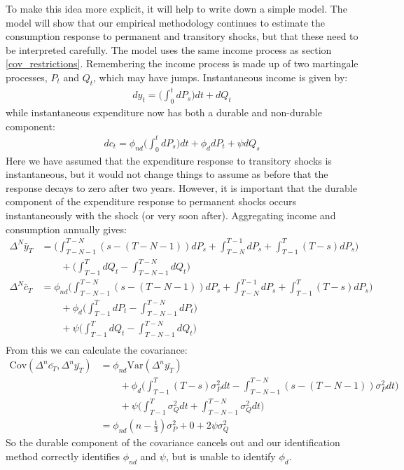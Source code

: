 \documentclass[titlepage]{\econtex}\newcommand{\texname}{ConsumptionHeterogeneity}
\begin{document}
To make this idea more explicit, it will help to write down a simple model. The model will show that our empirical methodology continues to estimate the consumption response to permanent and transitory shocks, but that these need to be interpreted carefully. The model uses the same income process as section \ref{cov_restrictions}. Remembering the income process is made up of two martingale processes, $P_t$ and $Q_t$, which may have jumps. Instantaneous income is given by:
\begin{align*}
dy_t = \Big( \int_{0}^{t}dP_s \Big) dt  +dQ_t 
\end{align*}
while instantaneous expenditure now has both a durable and non-durable component:
\begin{align*}
dc_t = \phi_{nd} \Big( \int_{0}^{t} dP_s  \Big) dt + \phi_{d} dP_t + \psi dQ_s
\end{align*}
Here we have assumed that the expenditure response to transitory shocks is instantaneous, but it would not change things to assume as before that the response decays to zero after two years. However, it is important that the durable component of the expenditure response to permanent shocks occurs instantaneously with the shock (or very soon after). Aggregating income and consumption annually gives:
\begin{align*}
\Delta^N \bar{y}_T &=  \Big(\int_{T-N-1}^{T-N} (s-(T-N-1))dP_s  + \int_{T-N}^{T-1}dP_s + \int_{T-1}^{T} (T-s)dP_s \Big) \\
& \qquad + \Big(\int_{T-1}^{T} dQ_t -\int_{T-N-1}^{T-N} dQ_t \Big) \\
\Delta^N \bar{c}_T &= \phi_{nd} \Big(\int_{T-N-1}^{T-N} (s-(T-N-1))dP_s  + \int_{T-N}^{T-1}dP_s + \int_{T-1}^{T} (T-s)dP_s \Big) \\
& \qquad + \phi_d \Big(\int_{T-1}^{T} dP_t -\int_{T-N-1}^{T-N} dP_t \Big) \\
& \qquad + \psi \Big(\int_{T-1}^{T} dQ_t -\int_{T-N-1}^{T-N} dQ_t \Big) \\
\end{align*}
From this we can calculate the covariance:
\begin{align*}
\mathrm{Cov}(\Delta^n \bar{c_T},\Delta^n \bar{y_T} ) &= \phi_{nd} \mathrm{Var}(\Delta^n \bar{y_T}) \\
& \qquad + \phi_d \Bigg( \int_{T-1}^{T} (T-s) \sigma_P^2 dt - \int_{T-N-1}^{T-N}(s-(T-N-1)) \sigma_P^2 dt \Bigg) \\
& \qquad + \psi\Bigg(\int_{T-1}^{T}  \sigma_Q^2 dt + \int_{T-N-1}^{T-N}\sigma_Q^2 dt\Bigg) \\
&= \phi_{nd} (n-\frac{1}{3})\sigma_P^2 + 0 +  2 \psi \sigma_Q^2
\end{align*}
So the durable component of the covariance cancels out and our identification method correctly identifies $\phi_{nd}$ and $\psi$, but is unable to identify $\phi_d$.
\end{document}
